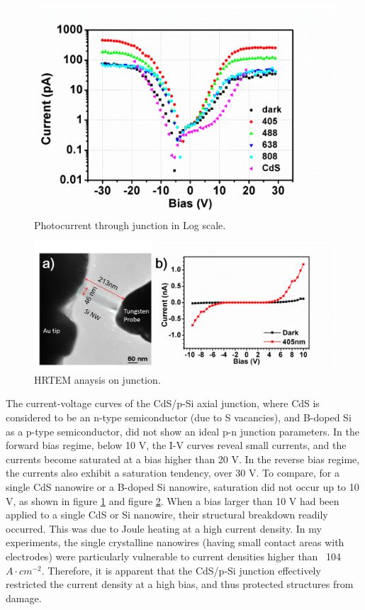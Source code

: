 \begin{figure}  
\includegraphics[width=\textwidth]{figures/figure3_4}
\caption[Photocurrent in Log scale.]{Photocurrent through junction in Log scale.
\label{fig:fig3_4}}
\end{figure}

\begin{figure}  
\includegraphics[width=\textwidth]{figures/figure3_s2}
\caption[HRTEM anaysis on junction.]{HRTEM anaysis on junction.
\label{fig:fig3_s2}}
\end{figure}


The current-voltage curves of the CdS/p-Si axial junction, where CdS is considered to be an n-type semiconductor (due to S vacancies), and B-doped Si as a p-type semiconductor, did not show an ideal p-n junction parameters. In the forward bias regime, below 10 V, the I-V curves reveal small currents, and the currents become saturated at a bias higher than 20 V. In the reverse bias regime, the currents also exhibit a saturation tendency, over 30 V. To compare, for a single CdS nanowire or a B-doped Si nanowire, saturation did not occur up to 10 V, as shown in figure \ref{fig:fig3_4} and figure \ref{fig:fig3_s2}. When a bias larger than 10 V had been applied to a single CdS or Si nanowire, their structural breakdown readily occurred. This was due to Joule heating at a high current density. \cite{Wu2004} In my experiments, the single crystalline nanowires (having small contact areas with electrodes) were particularly vulnerable to current densities higher than ~104 $A\cdot cm^{-2}$. Therefore, it is apparent that the CdS/p-Si junction effectively restricted the current density at a high bias, and thus protected structures from damage. 

